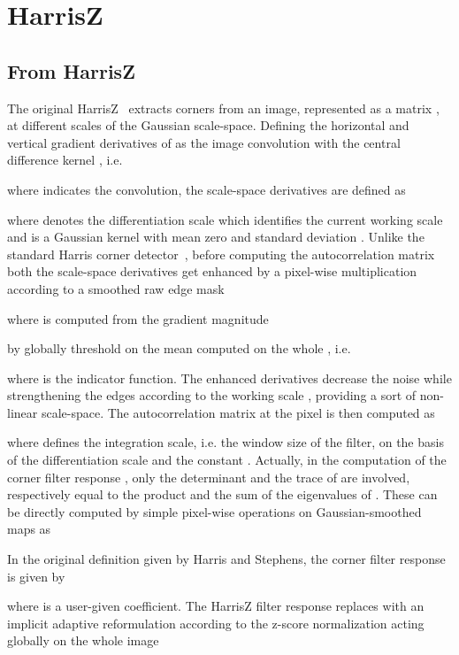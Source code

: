 \documentclass[times,twocolumn,final,authoryear]{elsarticle}
\begin{document}
\section{HarrisZ}\label{harrisz_description}
\vspace{-0.25em}
\subsection{From HarrisZ}\label{hz_desc}
The original HarrisZ~\citep{harrisz} extracts corners from an image, represented as a matrix , at different scales of the Gaussian scale-space. Defining the horizontal and vertical gradient derivatives of  as the image convolution with the central difference kernel , i.e.
\vspace{-0.25em}

\vspace{-0.25em}
where  indicates the convolution, the scale-space derivatives are defined as~\citep{hess_lapl_affine} 
\vspace{-0.25em}

where  denotes the differentiation scale which identifies the current working scale and  is a Gaussian kernel with mean zero and standard deviation . Unlike the standard Harris corner detector~\citep{harris}, before computing the autocorrelation matrix both the scale-space derivatives get enhanced by a pixel-wise multiplication according to a smoothed raw edge mask 

where  is computed from the gradient magnitude

by globally threshold on the mean  computed on the whole , i.e.

where  is the indicator function. The enhanced derivatives decrease the noise while strengthening the edges according to the working scale , providing a sort of non-linear scale-space.
The autocorrelation matrix at the pixel  is then computed as

where  defines the integration scale, i.e. the window size of the filter, on the basis of the differentiation scale  and the constant . Actually, in the computation of the corner filter response , only the determinant  and the trace  of  are involved, respectively equal to the product and the sum of the eigenvalues of . These can be directly computed by simple pixel-wise operations on Gaussian-smoothed maps as  

In the original definition given by Harris and Stephens, the corner filter response is given by

where  is a user-given coefficient. The HarrisZ filter response  replaces  with an implicit adaptive reformulation according to the z-score normalization  acting globally on the whole image 
\end{document}
